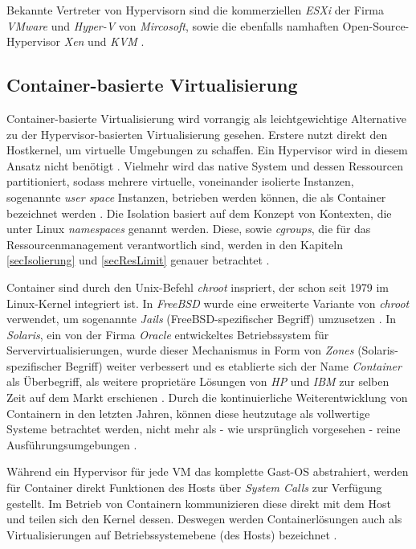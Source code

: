 \documentclass[../main.tex]{subfiles}
\begin{document}
      Bekannte Vertreter von Hypervisorn sind die kommerziellen \emph{ESXi} der Firma \emph{VMware} und \emph{Hyper-V} von \emph{Mircosoft}, sowie die ebenfalls namhaften Open-Source-Hypervisor \emph{Xen} und \emph{KVM} \cite[S.1]{dockerLXCKub}.

    \subsection{Container-basierte Virtualisierung}
    \label{introVirtContainer}
      Container-basierte Virtualisierung wird vorrangig als leichtgewichtige Alternative zu der Hypervisor-basierten Virtualisierung gesehen\cite[S.2]{containerVirtPerformance}. Erstere nutzt direkt den Hostkernel, um virtuelle Umgebungen zu schaffen. Ein Hypervisor wird in diesem Ansatz nicht benötigt \cite[S.6+7]{dockerBook}. Vielmehr wird das native System und dessen Ressourcen partitioniert, sodass mehrere virtuelle, voneinander isolierte Instanzen, sogenannte \emph{user space} Instanzen, betrieben werden können, die als Container bezeichnet werden \cite[S.2]{containerVirtPerformance}\cite[S.3]{dockerSecIntro}\cite[S.1]{dockerSec2}. Die Isolation basiert auf dem Konzept von Kontexten, die unter Linux \emph{namespaces} genannt werden. Diese, sowie \emph{cgroups}, die für das Ressourcenmanagement verantwortlich sind, werden in den Kapiteln \ref{secIsolierung} und \ref{secResLimit} genauer betrachtet \cite[S.4]{dockerSecIntro}.

      Container sind durch den Unix-Befehl \emph{chroot}\cite{chroot} inspriert, der schon seit 1979 im Linux-Kernel integriert ist. In \emph{FreeBSD} wurde eine erweiterte Variante von \emph{chroot} verwendet, um sogenannte \emph{Jails} (FreeBSD-spezifischer Begriff) umzusetzen \cite{jails}. In \emph{Solaris}, ein von der Firma \emph{Oracle} entwickeltes Betriebssystem für Servervirtualisierungen\cite{solaris}, wurde dieser Mechanismus in Form von \emph{Zones} (Solaris-spezifischer Begriff) \cite{zones} weiter verbessert und es etablierte sich der Name \emph{Container} als Überbegriff, als weitere proprietäre Lösungen von \emph{HP} und \emph{IBM} zur selben Zeit auf dem Markt erschienen \cite[S.2]{dockerLXCKub}. Durch die kontinuierliche Weiterentwicklung von Containern in den letzten Jahren, können diese heutzutage als vollwertige Systeme betrachtet werden, nicht mehr als - wie ursprünglich vorgesehen - reine Ausführungsumgebungen \cite[S.7]{dockerBook}.

      Während ein Hypervisor für jede \acrshort{VM} das komplette Gast-\acrshort{OS} abstrahiert, werden für Container direkt Funktionen des Hosts über \emph{System Calls} zur Verfügung gestellt. Im Betrieb von Containern kommunizieren diese direkt mit dem Host und teilen sich den Kernel dessen. Deswegen werden Containerlösungen auch als Virtualisierungen auf Betriebssystemebene (des Hosts) bezeichnet \cite[S.6+7]{dockerBook}\cite[S.2]{containerVirtPerformance}\cite[S.3]{dockerLXCKub}.
\end{document}
